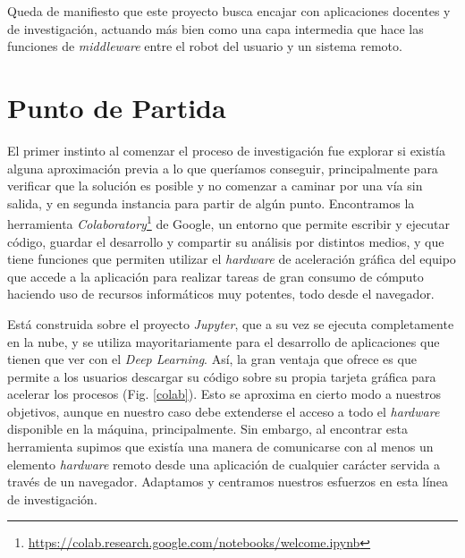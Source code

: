 Queda de manifiesto que este proyecto busca encajar con aplicaciones docentes y de investigación, actuando más bien como una capa intermedia que hace las funciones de \textit{middleware} entre el robot del usuario y un sistema remoto.

\section{Punto de Partida}

El primer instinto al comenzar el proceso de investigación fue explorar si existía alguna aproximación previa a lo que queríamos conseguir, principalmente para verificar que la solución es posible y no comenzar a caminar por una vía sin salida, y en segunda instancia para partir de algún punto. Encontramos la herramienta \textit{Colaboratory}\footnote{\url{https://colab.research.google.com/notebooks/welcome.ipynb}} de Google, un entorno que permite escribir y ejecutar código, guardar el desarrollo y compartir su análisis por distintos medios, y que tiene funciones que permiten utilizar el \textit{hardware} de aceleración gráfica del equipo que accede a la aplicación para realizar tareas de gran consumo de cómputo haciendo uso de recursos informáticos muy potentes, todo desde el navegador. 

Está construida sobre el proyecto \textit{Jupyter}, que a su vez se ejecuta completamente en la nube, y se utiliza mayoritariamente para el desarrollo  de aplicaciones que tienen que ver con el \textit{Deep Learning}. Así, la gran ventaja que ofrece es que permite a los usuarios descargar su código sobre su propia tarjeta gráfica para acelerar los procesos (Fig. \ref{colab}). Esto se aproxima en cierto modo a nuestros objetivos, aunque en nuestro caso debe extenderse el acceso a todo el \textit{hardware} disponible en la máquina, principalmente. Sin embargo, al encontrar esta herramienta supimos que existía una manera de comunicarse con al menos un elemento \textit{hardware} remoto desde una aplicación de cualquier carácter servida a través de un navegador. Adaptamos y centramos nuestros esfuerzos en esta línea de investigación.


